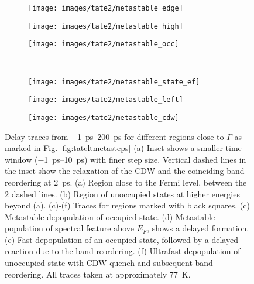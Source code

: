 \begin{figure}[t!]
	\centering
	\begin{subfigure}[b]{0.33\textwidth}
		\texttt{[image: images/tate2/metastable\_edge]}
		\caption{}
	\end{subfigure}
	\begin{subfigure}[b]{0.33\textwidth}
		\texttt{[image: images/tate2/metastable\_high]}
		\caption{}
	\end{subfigure}
	\begin{subfigure}[b]{0.33\textwidth}
		\texttt{[image: images/tate2/metastable\_occ]}
		\caption{}
	\end{subfigure}
	\\
	\begin{subfigure}[b]{0.33\textwidth}
		\texttt{[image: images/tate2/metastable\_state\_ef]}
		\caption{}
	\end{subfigure}
	\begin{subfigure}[b]{0.33\textwidth}
		\texttt{[image: images/tate2/metastable\_left]}
		\caption{}
	\end{subfigure}
	\begin{subfigure}[b]{0.33\textwidth}
		\texttt{[image: images/tate2/metastable\_cdw]}
		\caption{}
	\end{subfigure}
	\caption{Delay traces from \qtyrange{-1}{200}{\pico\second} for different regions close to $\Gamma$ as marked in Fig. \ref{fig:tateltmetasteps} (a) Inset shows a smaller time window (\qtyrange{-1}{10}{\pico\second}) with finer step size. Vertical dashed lines in the inset show the relaxation of the CDW and the coinciding band reordering at \qty{2}{\pico\second}. (a) Region close to the Fermi level, between the 2 dashed lines. (b) Region of unoccupied states at higher energies beyond (a). (c)-(f) Traces for regions marked with black squares. (c) Metastable depopulation of occupied state. (d) Metastable population of spectral feature above $E_F$, shows a delayed formation. (e) Fast depopulation of an occupied state, followed by a delayed reaction due to the band reordering. (f) Ultrafast depopulation of unoccupied state with CDW quench and subsequent band reordering. All traces taken at approximately \qty{77}{\kelvin}.}
	\label{fig:metastableedge}
\end{figure}

